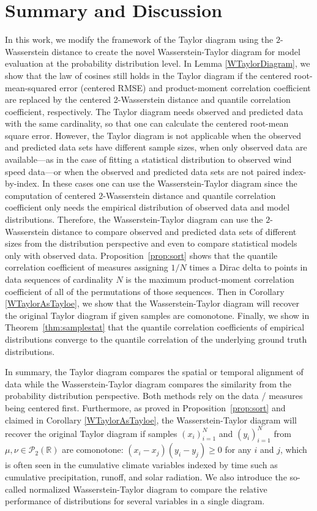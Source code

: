 \documentclass{amsart}
\numberwithin{equation}{section}
\theoremstyle{plain}
\theoremstyle{definition}
\begin{document}
\section{Summary and Discussion}\label{sec:summary}
In this work, we modify the framework of the Taylor diagram using the $2$-Wasserstein distance to create the novel Wasserstein-Taylor diagram for model evaluation at the probability distribution level.
 In Lemma \ref{WTaylorDiagram}, we show that the law of cosines still holds in the Taylor diagram if the centered root-mean-squared error (centered RMSE) and product-moment correlation coefficient are replaced by the centered 2-Wasserstein distance  and quantile correlation coefficient, respectively. 
 The Taylor diagram needs observed and predicted data with the same cardinality, so that one can calculate the centered root-mean square error.
However, the Taylor diagram is not applicable when the observed and predicted data sets have different sample sizes, when only observed data are available---as in the case of fitting a statistical distribution to observed wind speed data---or when the observed and predicted data sets are not paired index-by-index.
In these cases one can use the Wasserstein-Taylor diagram since the computation of centered  $2$-Wasserstein distance and quantile correlation coefficient only needs the empirical distribution of observed data and model distributions. 
Therefore, the Wasserstein-Taylor diagram can use the $2$-Wasserstein distance to compare observed and predicted data sets of different sizes from the distribution perspective and even to compare statistical models only with observed data. 
Proposition~\ref{prop:sort} shows that the quantile correlation coefficient of measures assigning $1/N$ times a Dirac delta to points in data sequences of cardinality $N$ is the maximum product-moment correlation coefficient of all of the permutations of those sequences. Then in Corollary \ref{WTaylorAsTayloe}, we show that the Wasserstein-Taylor diagram will recover the original Taylor diagram if given samples are comonotone. Finally, we show in Theorem~\ref{thm:samplestat} that the quantile correlation coefficients of empirical distributions converge to the quantile correlation of the underlying ground truth distributions.

In summary, the Taylor diagram compares the spatial or temporal alignment of data while the Wasserstein-Taylor diagram compares the similarity from the probability distribution perspective. 
Both methods rely on the data / measures being centered first.
Furthermore, as proved in Proposition~\ref{prop:sort} and claimed in  Corollary \ref{WTaylorAsTayloe},  the Wasserstein-Taylor diagram will recover the original Taylor diagram if samples $(x_i)_{i=1}^N$ and $(y_i)_{i=1}^N$  from $\mu, \nu \in \mathcal{P}_2(\mathbb{R})$  are comonotone: $(x_i-x_j)(y_i-y_j) \geq 0$ for any $i$ and $j$, which is often seen in the cumulative climate variables indexed by time such as cumulative precipitation, runoff, and solar radiation. 
We also introduce the so-called normalized Wasserstein-Taylor diagram to compare the relative performance of distributions for
several variables in a single diagram. 
\end{document}

